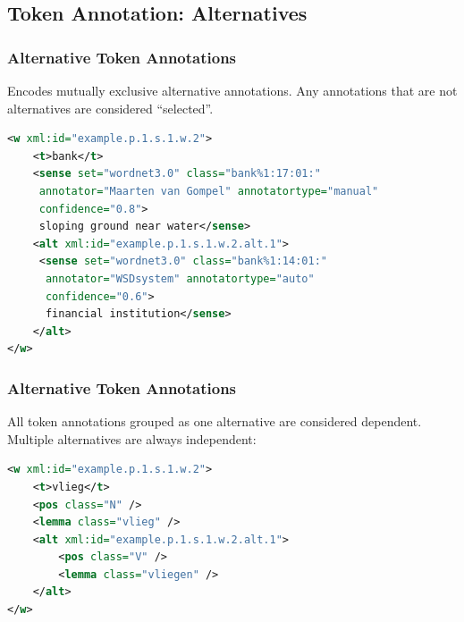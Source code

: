 \documentclass[compress,10pt]{beamer}
\begin{document}
\subsection{Token Annotation: Alternatives}

\begin{frame}[fragile]
\frametitle{Alternative Token Annotations}

Encodes mutually exclusive alternative annotations. Any annotations that are not alternatives are considered ``selected''.

\begin{lstlisting}[language=xml]
<w xml:id="example.p.1.s.1.w.2">
    <t>bank</t>
    <sense set="wordnet3.0" class="bank%1:17:01:"    
     annotator="Maarten van Gompel" annotatortype="manual" 
     confidence="0.8">
     sloping ground near water</sense>
    <alt xml:id="example.p.1.s.1.w.2.alt.1">
     <sense set="wordnet3.0" class="bank%1:14:01:"
      annotator="WSDsystem" annotatortype="auto" 
      confidence="0.6">     
      financial institution</sense> 
    </alt>
</w>                         
\end{lstlisting}        

\end{frame}

\begin{frame}[fragile]
\frametitle{Alternative Token Annotations}

All token annotations grouped as one alternative are considered dependent. Multiple alternatives are always independent:

\begin{lstlisting}[language=xml]
<w xml:id="example.p.1.s.1.w.2">
    <t>vlieg</t>
    <pos class="N" />
    <lemma class="vlieg" />
    <alt xml:id="example.p.1.s.1.w.2.alt.1">
        <pos class="V" />
        <lemma class="vliegen" />
    </alt>
</w>                         
\end{lstlisting}        

\end{frame}
\end{document}

